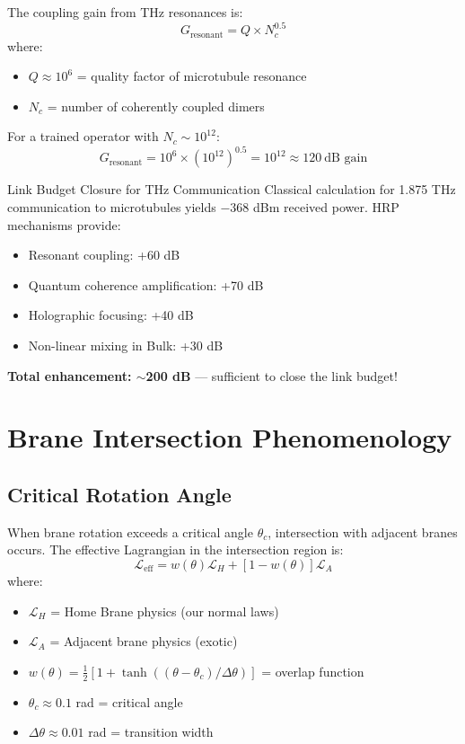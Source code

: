 The coupling gain from THz resonances is:
\begin{equation}
G_{\text{resonant}} = Q \times N_c^{0.5}
\end{equation}
where:
\begin{itemize}
\item $Q \approx 10^6$ = quality factor of microtubule resonance
\item $N_c$ = number of coherently coupled dimers
\end{itemize}

For a trained operator with $N_c \sim 10^{12}$:
\begin{equation}
G_{\text{resonant}} = 10^6 \times (10^{12})^{0.5} = 10^{12} \approx 120\ \text{dB gain}
\end{equation}

\begin{calloutbox}{Link Budget Closure for THz Communication}
Classical calculation for 1.875 THz communication to microtubules yields $-368$ dBm received power. HRP mechanisms provide:
\begin{itemize}
\item Resonant coupling: +60 dB
\item Quantum coherence amplification: +70 dB
\item Holographic focusing: +40 dB
\item Non-linear mixing in Bulk: +30 dB
\end{itemize}
\textbf{Total enhancement: $\sim$200 dB} --- sufficient to close the link budget!
\end{calloutbox}

\section{Brane Intersection Phenomenology}

\subsection{Critical Rotation Angle}

When brane rotation exceeds a critical angle $\theta_c$, intersection with adjacent branes occurs. The effective Lagrangian in the intersection region is:
\begin{equation}
\mathcal{L}_{\text{eff}} = w(\theta)\mathcal{L}_H + [1-w(\theta)]\mathcal{L}_A
\end{equation}
where:
\begin{itemize}
\item $\mathcal{L}_H$ = Home Brane physics (our normal laws)
\item $\mathcal{L}_A$ = Adjacent brane physics (exotic)
\item $w(\theta) = \frac{1}{2}[1 + \tanh((\theta - \theta_c)/\Delta\theta)]$ = overlap function
\item $\theta_c \approx 0.1$ rad = critical angle
\item $\Delta\theta \approx 0.01$ rad = transition width
\end{itemize}

